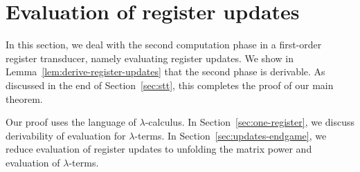 
\section{Evaluation of register updates}
\label{sec:stt-derivable}
In this section, we deal with the second computation phase in a first-order register transducer, namely evaluating register updates. We show in Lemma~\ref{lem:derive-register-updates} that the second phase is derivable. As  discussed in the end of Section~\ref{sec:stt}, this completes the proof of our main theorem. 



Our proof uses the language of $\lambda$-calculus.  In Section~\ref{sec:one-register},  we discuss derivability of  evaluation for $\lambda$-terms. In Section~\ref{sec:updates-endgame}, we reduce evaluation of register updates to  unfolding the matrix power  and evaluation of $\lambda$-terms.  


%



  
